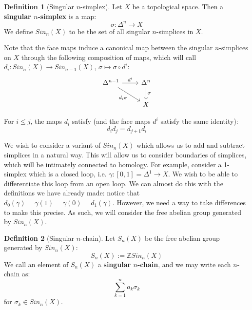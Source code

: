 \documentclass[11pt, oneside]{amsart}   	%
\theoremstyle{definition}
\newtheorem{definition}{Definition}[section]
\begin{document}
\begin{definition}[Singular $n$-simplex]
	Let $X$ be a topological space. Then a \textbf{singular $n$-simplex} is a map:
	\begin{equation}
		\sigma : \Delta^n\rightarrow X
	\end{equation}
	We define $Sin_n(X)$ to be the set of all singular $n$-simplices in $X$. 
\end{definition}

Note that the face maps induce a canonical map between the singular $n$-simplices on $X$ through the 
following composition of maps, which will call $d_i : Sin_n(X)\rightarrow Sin_{n - 1}(X)$, $\sigma\mapsto \sigma\circ d^i$:
\begin{equation}
	\begin{tikzcd}
		\Delta^{n - 1}\arrow[r, "d^i"]\arrow[dr, swap, "d_i\sigma"] & \Delta^n\arrow[d, "\sigma"] \\
		 & X
	\end{tikzcd}
\end{equation}

For $i\leq j$, the maps $d_i$ satisfy (and the face maps $d^i$ satisfy the same identity): 
\begin{equation}
	d_i d_j = d_{j + 1} d_i
\end{equation}

We wish to consider a variant of $Sin_n(X)$ which allows us to add and subtract simplices in a natural 
way. This will allow us to consider boundaries of simplices, which will be intimately connected to homology.  
For example, consider a 1-simplex which is a closed loop, i.e. $\gamma : [0, 1] = \Delta^1\rightarrow X$. 
We wish to be able to differentiate this loop from an open loop. We can almost do this with the definitions 
we have already made: notice that $d_0(\gamma) = \gamma(1) = \gamma(0) = d_1(\gamma)$. However, 
we need a way to take differences to make this precise. As such, we will consider the free abelian 
group generated by $Sin_n(X)$.
\begin{definition}[Singular $n$-chain]
	Let $S_n(X)$ be the free abelian group generated by $Sin_n(X)$:
	\begin{equation}
		S_n(X) := \mathbb Z Sin_n(X)
	\end{equation}
	We call an element of $S_n(X)$ a \textbf{singular $n$-chain}, and we may write each $n$-chain as:
	\begin{equation}
		\sum_{k = 1}^n a_k\sigma_k
	\end{equation}
	for $\sigma_k\in Sin_n(X)$. 
\end{definition}
\end{document}
